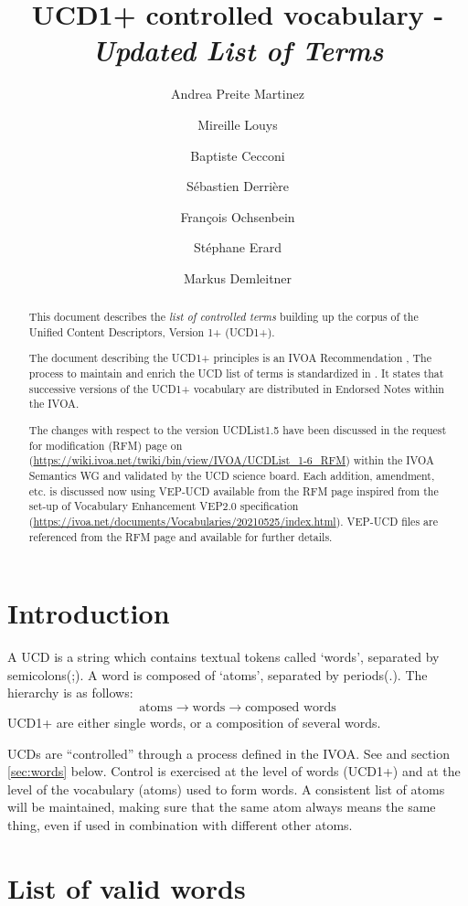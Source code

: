\documentclass[11pt,a4paper]{ivoa}
\title{UCD1+ controlled vocabulary - \emph{Updated List of Terms}}
\author{Andrea Preite Martinez}
\author{Mireille Louys}
\author{Baptiste Cecconi}
\author{S\'ebastien Derri\`ere}
\author{Fran\c cois Ochsenbein}
\author{St\'ephane Erard}
\author{Markus Demleitner}
\begin{document}
\begin{abstract}
This document describes the \emph{list of controlled terms}  building up the corpus of the Unified Content Descriptors, Version 1+ (UCD1+). 

The document describing the UCD1+ principles is an IVOA Recommendation \citep{2018ivoa.spec.0527P},
The process to maintain and enrich the UCD list of terms is standardized in   \citep{2019ivoa.spec.1007G}.
It states that successive versions of the UCD1+ vocabulary are distributed in Endorsed Notes within the IVOA.

The changes with respect to the version UCDList1.5 have been discussed in the request for modification (RFM) page on (\url{https://wiki.ivoa.net/twiki/bin/view/IVOA/UCDList_1-6_RFM}) within the IVOA Semantics WG and validated by the UCD science board.
Each addition, amendment, etc.  is discussed now using VEP-UCD available from the RFM page  inspired from the set-up of Vocabulary Enhancement VEP2.0 specification (\url{https://ivoa.net/documents/Vocabularies/20210525/index.html}). 
VEP-UCD files are referenced from the RFM page and available for further details.
\end{abstract} 

\section{Introduction}

A UCD is a string which contains textual tokens called `words', separated by semicolons(;). A word is 
composed of `atoms', separated by periods(.). The hierarchy is as follows: 
$$
\textrm{atoms} \rightarrow \textrm{words} \rightarrow \textrm{composed words}
$$
UCD1+ are either single words, or a composition of several words.

UCDs are ``controlled'' through a process defined in the IVOA. See \citet{2005ivoa.spec.0819D} and 
section \ref{sec:words} below. Control is exercised at the level of words (UCD1+) and at the level 
of the vocabulary (atoms) used to form words. A consistent list of atoms will be maintained, making 
sure that the same atom always means the same thing, even if used in combination with different other 
atoms. 


\section{List of valid words}
\label{sec:list}
\end{document}
